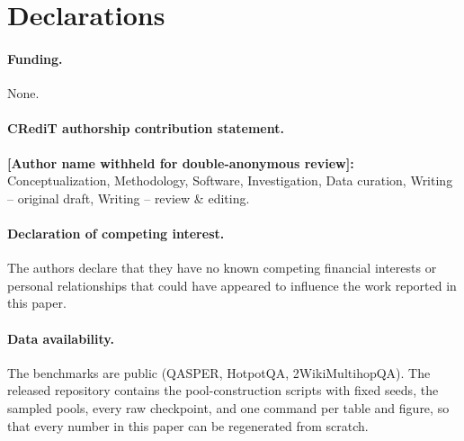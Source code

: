 \documentclass[review,12pt]{elsarticle}
\theoremstyle{remark}
\begin{document}
\section*{Declarations}

\paragraph{Funding.} None.

\paragraph{CRediT authorship contribution statement.}
\textbf{[Author name withheld for double-anonymous review]:} Conceptualization, Methodology, Software,
Investigation, Data curation, Writing -- original draft, Writing --
review \& editing.

\paragraph{Declaration of competing interest.}
The authors declare that they have no known competing financial
interests or personal relationships that could have appeared to
influence the work reported in this paper.

\paragraph{Data availability.}
The benchmarks are public (QASPER, HotpotQA, 2WikiMultihopQA). The
released repository contains the pool-construction scripts with fixed
seeds, the sampled pools, every raw checkpoint, and one command per
table and figure, so that every number in this paper can be
regenerated from scratch.




\appendix
\end{document}
